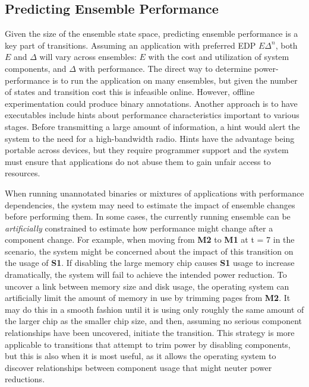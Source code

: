 \subsection{Predicting Ensemble Performance}
\label{subsec-predict}

Given the size of the ensemble state space, predicting ensemble performance
is a key part of transitions. Assuming an application with preferred EDP
$E\Delta^n$, both $E$ and $\Delta$ will vary across ensembles: $E$ with the
cost and utilization of system components, and $\Delta$ with performance. The
direct way to determine power-performance is to run the application on many
ensembles, but given the number of states and transition cost this is
infeasible online. However, offline experimentation could produce binary
annotations. Another approach is to have executables include hints about
performance characteristics important to various stages. Before transmitting
a large amount of information, a hint would alert the system to the need for
a high-bandwidth radio. Hints have the advantage being portable across
devices, but they require programmer support and the system must ensure that
applications do not abuse them to gain unfair access to resources.

When running unannotated binaries or mixtures of applications with
performance dependencies, the system may need to estimate the impact of
ensemble changes before performing them. In some cases, the currently running
ensemble can be \textit{artificially} constrained to estimate how performance
might change after a component change. For example, when moving from
\textbf{M2} to \textbf{M1} at t = 7 in the scenario, the system might be
concerned about the impact of this transition on the usage of \textbf{S1}. If
disabling the large memory chip causes \textbf{S1} usage to increase
dramatically, the system will fail to achieve the intended power reduction.
To uncover a link between memory size and disk usage, the operating system
can artificially limit the amount of memory in use by trimming pages from
\textbf{M2}. It may do this in a smooth fashion until it is using only
roughly the same amount of the larger chip as the smaller chip size, and
then, assuming no serious component relationships have been uncovered,
initiate the transition. This strategy is more applicable to transitions that
attempt to trim power by disabling components, but this is also when it is
most useful, as it allows the operating system to discover relationships
between component usage that might neuter power reductions.

